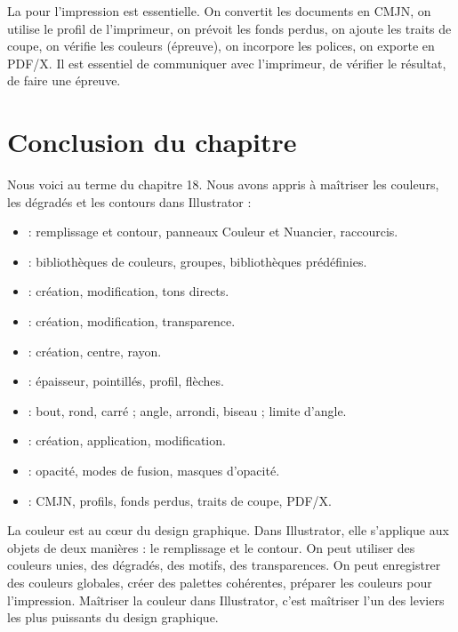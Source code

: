 La  pour l'impression est essentielle. On convertit les documents en CMJN, on utilise le profil de l'imprimeur, on prévoit les fonds perdus, on ajoute les traits de coupe, on vérifie les couleurs (épreuve), on incorpore les polices, on exporte en PDF/X. Il est essentiel de communiquer avec l'imprimeur, de vérifier le résultat, de faire une épreuve.

\section*{Conclusion du chapitre}

Nous voici au terme du chapitre 18. Nous avons appris à maîtriser les couleurs, les dégradés et les contours dans Illustrator :

\begin{itemize}
    \item {} : remplissage et contour, panneaux Couleur et Nuancier, raccourcis.
    \item {} : bibliothèques de couleurs, groupes, bibliothèques prédéfinies.
    \item {} : création, modification, tons directs.
    \item {} : création, modification, transparence.
    \item {} : création, centre, rayon.
    \item {} : épaisseur, pointillés, profil, flèches.
    \item {} : bout, rond, carré ; angle, arrondi, biseau ; limite d'angle.
    \item {} : création, application, modification.
    \item {} : opacité, modes de fusion, masques d'opacité.
    \item {} : CMJN, profils, fonds perdus, traits de coupe, PDF/X.
\end{itemize}

La couleur est au cœur du design graphique. Dans Illustrator, elle s'applique aux objets de deux manières : le remplissage et le contour. On peut utiliser des couleurs unies, des dégradés, des motifs, des transparences. On peut enregistrer des couleurs globales, créer des palettes cohérentes, préparer les couleurs pour l'impression. Maîtriser la couleur dans Illustrator, c'est maîtriser l'un des leviers les plus puissants du design graphique.

